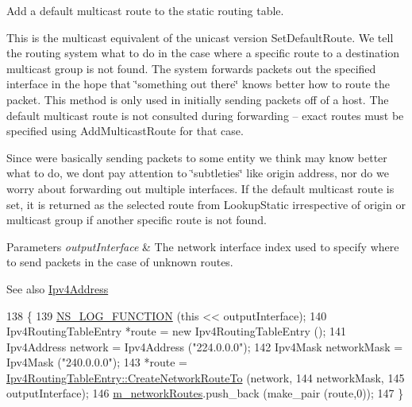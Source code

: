 Add a default multicast route to the static routing table. 

This is the multicast equivalent of the unicast version Set\+Default\+Route. We tell the routing system what to do in the case where a specific route to a destination multicast group is not found. The system forwards packets out the specified interface in the hope that \char`\"{}something out there\char`\"{} knows better how to route the packet. This method is only used in initially sending packets off of a host. The default multicast route is not consulted during forwarding -- exact routes must be specified using Add\+Multicast\+Route for that case.

Since we\textquotesingle{}re basically sending packets to some entity we think may know better what to do, we don\textquotesingle{}t pay attention to \char`\"{}subtleties\char`\"{} like origin address, nor do we worry about forwarding out multiple interfaces. If the default multicast route is set, it is returned as the selected route from Lookup\+Static irrespective of origin or multicast group if another specific route is not found.


\begin{DoxyParams}{Parameters}
{\em output\+Interface} & The network interface index used to specify where to send packets in the case of unknown routes.\\
\hline
\end{DoxyParams}
\begin{DoxySeeAlso}{See also}
\hyperlink{classns3_1_1Ipv4Address}{Ipv4\+Address} 
\end{DoxySeeAlso}

\begin{DoxyCode}
138 \{
139   \hyperlink{log-macros-disabled_8h_a90b90d5bad1f39cb1b64923ea94c0761}{NS\_LOG\_FUNCTION} (\textcolor{keyword}{this} << outputInterface);
140   Ipv4RoutingTableEntry *route = \textcolor{keyword}{new} Ipv4RoutingTableEntry ();
141   Ipv4Address network = Ipv4Address (\textcolor{stringliteral}{"224.0.0.0"});
142   Ipv4Mask networkMask = Ipv4Mask (\textcolor{stringliteral}{"240.0.0.0"});
143   *route = \hyperlink{classns3_1_1Ipv4RoutingTableEntry_abe3447a00495ded05ab095673531947a}{Ipv4RoutingTableEntry::CreateNetworkRouteTo} (network,
144                                                         networkMask,
145                                                         outputInterface);
146   \hyperlink{classns3_1_1Ipv4StaticRouting_a81e0b111629b14fff2efbf69180a64c1}{m\_networkRoutes}.push\_back (make\_pair (route,0));
147 \}
\end{DoxyCode}


